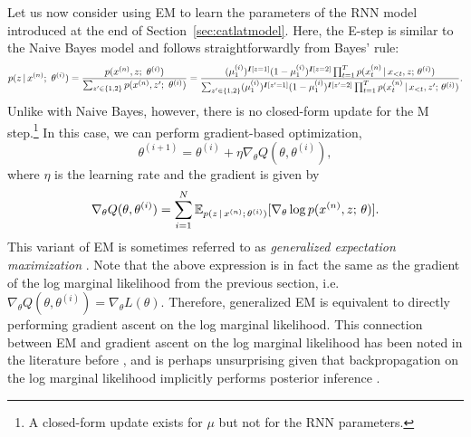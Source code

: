 \documentclass{article}
\begin{document}
Let us now consider using EM to learn the parameters of the RNN model introduced at the end of Section~\ref{sec:catlatmodel}. Here, the E-step is similar to the Naive Bayes model and follows straightforwardly from Bayes' rule:
\begin{align*} p(z \given x^{(n)} ; \ \theta^{(i)}) = \frac{p(x^{(n)}, z ; \ \theta^{(i)})}{\sum_{z' \in \{1, 2\}}p(x^{(n)} , z'; \ \theta^{(i)})} = \frac{(\mu_1^{(i)})^{\ident[z = 1]} (1-\mu_1^{(i)})^{\ident[z=2]}\prod_{t=1}^T p(x_t^{(n)} \given x_{<t}, z \param \theta^{(i)})}{\sum_{z'\in\{1,2\}} (\mu_1^{(i)})^{\ident[z' = 1]} (1-\mu_1^{(i)})^{\ident[z'=2]} \prod_{t=1}^{T} p(x_t^{(n)} \given x_{<t}, z' \param \theta^{(i)})}.
\end{align*}
Unlike with Naive Bayes, however, there is no closed-form update for the M step.\footnote{A closed-form update
exists for $\mu$ but not for the RNN parameters.} In this case, we can perform gradient-based optimization,
\[ \theta^{(i+1)} = \theta^{(i)} + \eta \nabla_\theta Q(\theta, \theta^{(i)}),\]
where $\eta$ is the learning rate and the gradient is given by
\[ \nabla_\theta Q(\theta, \theta^{(i)}) = \sum_{i=1}^N \mathbb{E}_{p(z \,|\, x^{(n)} ; \, \theta^{(i)})} [\nabla_{\theta} \log p(x^{(n)}, z ; \, \theta)].\]
This variant of EM is sometimes referred to  as \emph{generalized expectation maximization}  \citep{dempster77em,neal1998,Murphy:2012:MLP:2380985}.
Note that the above expression is in fact the same as the gradient of the log marginal likelihood from the previous section, i.e. $\nabla_\theta Q(\theta, \theta^{(i)}) = \nabla_\theta L(\theta)$. Therefore, generalized
EM is equivalent to directly performing gradient ascent on the log marginal likelihood. This connection between 
EM and gradient ascent on the log marginal likelihood has been noted in the literature before \citep{salak2003,kirk2010,sutton2012introduction}, and is perhaps unsurprising given that backpropagation on the log marginal likelihood implicitly performs posterior inference \citep{eisner2016}. 
\end{document}
